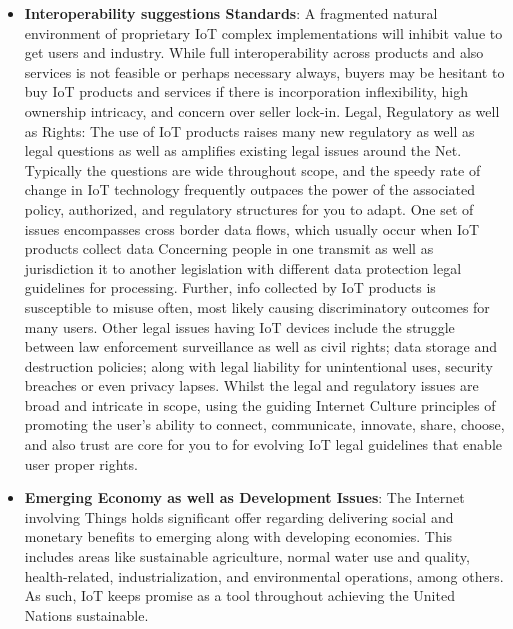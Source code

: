 \begin{itemize}
 \item \textbf{Interoperability suggestions Standards}: A fragmented natural environment of proprietary IoT complex implementations will inhibit value to get users and industry. While full interoperability across products and also services is not feasible or perhaps necessary always, buyers may be hesitant to buy IoT products and services if there is incorporation inflexibility, high ownership intricacy, and concern over seller lock-in. Legal, Regulatory as well as Rights: The use of IoT products raises many new regulatory as well as legal questions as well as amplifies existing legal issues around the Net. Typically the questions are wide throughout scope, and the speedy rate of change in IoT technology frequently outpaces the power of the associated policy, authorized, and regulatory structures for you to adapt. One set of issues encompasses cross border data flows, which usually occur when IoT products collect data
 Concerning people in one transmit as well as jurisdiction it to another legislation with different data protection legal guidelines for processing. Further, info collected by IoT products is susceptible to misuse often, most likely causing discriminatory outcomes for many users. Other legal issues having IoT devices include the struggle between law enforcement surveillance as well as civil rights; data storage and destruction policies; along with legal liability for unintentional uses, security breaches or even privacy lapses.
 Whilst the legal and regulatory issues are broad and intricate in scope, using the guiding Internet Culture principles of promoting the user’s ability to connect, communicate, innovate, share, choose,  and also trust are core for you to for evolving IoT legal guidelines that enable user proper rights.

 \item \textbf{Emerging Economy as well as Development Issues}: The Internet involving Things holds significant offer regarding delivering social and monetary benefits to emerging along with developing economies. This includes areas like sustainable agriculture, normal water use and quality, health-related, industrialization, and environmental operations, among others. As such, IoT keeps promise as a tool throughout achieving the United Nations sustainable.


\end{itemize}
